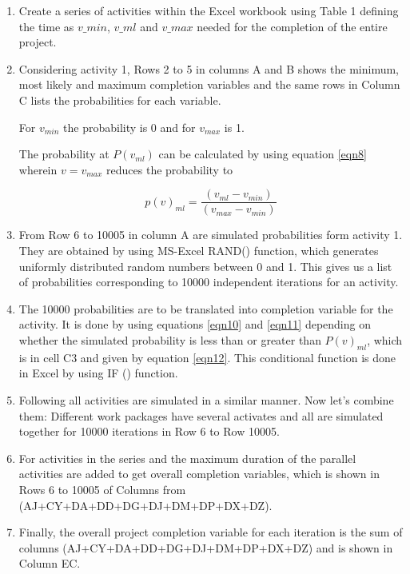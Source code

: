 \begin{enumerate}
	\item Create a series of activities within the Excel workbook \cite{Github} using Table 1 defining the time as $v\_min$, $v\_ml$ and $v\_max$ needed for the completion of the entire project.
	
	\item Considering activity 1, Rows 2 to 5 in columns A and B shows the minimum, most likely and maximum completion variables and the same rows in Column C lists the probabilities for each variable.
	
	For $v_ {min} $ the probability is 0 and for $v_ {max} $ is 1. 
	
	The probability at $P (v_ {ml}) $ can be calculated by using equation \ref{eqn8} wherein $v = v_ {max} $ reduces the probability to 
	
	\begin{equation}
	p(v)_{ml}  = \frac{(v_{ml} - v_{min})}{  (v_{max} - v_{min}) } 
	\label{eqn5.1}
	\end{equation}
	
	\item From Row 6 to 10005 in column A are simulated probabilities form activity 1. They are obtained by using MS-Excel RAND() function, which generates uniformly distributed random numbers between 0 and 1. This gives us a list of probabilities corresponding to 10000 independent iterations for an activity.
	
	\item The 10000 probabilities are to be translated into completion variable for the activity. It is done by using equations \ref{eqn10} and \ref{eqn11} depending on whether the simulated probability is less than or greater than $P(v)_ {ml}$, which is in cell C3 and given by equation \ref{eqn12}. This conditional function is done in Excel by using IF () function.
	
	\item Following all activities are simulated in a similar manner. Now let's combine them: Different work packages have several activates and all are simulated together for 10000 iterations in Row 6 to Row 10005.
	
	\item For activities in the series and the maximum duration of the parallel activities are added to get overall completion variables, which is shown in Rows 6 to 10005 of Columns from (AJ+CY+DA+DD+DG+DJ+DM+DP+DX+DZ).
	
	\item Finally, the overall project completion variable for each iteration is the sum of columns (AJ+CY+DA+DD+DG+DJ+DM+DP+DX+DZ) and is shown in Column EC.
	

\end{enumerate}
